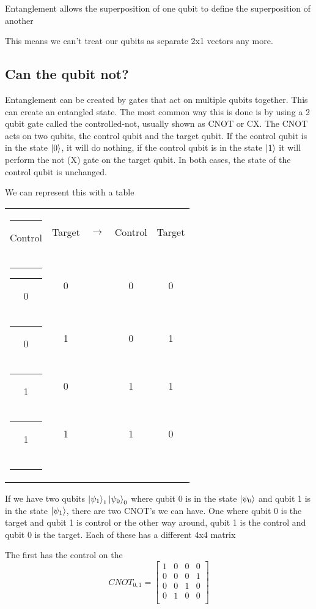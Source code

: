 \documentclass{book}
\begin{document}
Entanglement allows the superposition of one qubit to define the superposition of another

This means we can't treat our qubits as separate 2x1 vectors any more. 


\subsection{ Can the qubit not? }

Entanglement can be created by gates that act on multiple qubits together. This can create an entangled state. The most common way this is done is by using a 2 qubit gate called the controlled-not, usually shown as CNOT or CX. The CNOT acts on two qubits, the control qubit and the target qubit. If the control qubit is in the state $\ket{0}$, it will do nothing, if the control qubit is in the state $\ket{1}$ it will perform the not (X) gate on the target qubit. In both cases, the state of the control qubit is unchanged. 

We can represent this with a table

\begin{center}
\begin{tabular}{ | c | c | c | c | c |}
\hrule
 Control & Target & $\rightarrow{}$ & Control & Target \\ 
  \hrule\hrule
 0 & 0 &  & 0 & 0 \\ 
 \hrule
 0 & 1 &  & 0 & 1 \\
 \hrule
 1 & 0 &  & 1 & 1 \\
 \hrule
 1 & 1 &  & 1 & 0 \\
 \hrule
  
\end{tabular}
\end{center}

If we have two qubits $\ket{\psi_1}_1\ket{\psi_0}_0$ where qubit 0 is in the state $\ket{\psi_0}$ and qubit 1 is in the state $\ket{\psi_1}$, there are two CNOT's we can have. One where qubit 0 is the target and qubit 1 is control or the other way around, qubit 1 is the control and qubit 0 is the target. Each of these has a different 4x4 matrix


The first has the control on the 
$$
CNOT_{0, 1} = \begin{bmatrix} 1 & 0 & 0 & 0 \\
0 & 0 & 0 & 1 \\
0 & 0 & 1 & 0 \\
0 & 1 & 0 & 0 \\
\end{bmatrix}
$$
\end{document}
